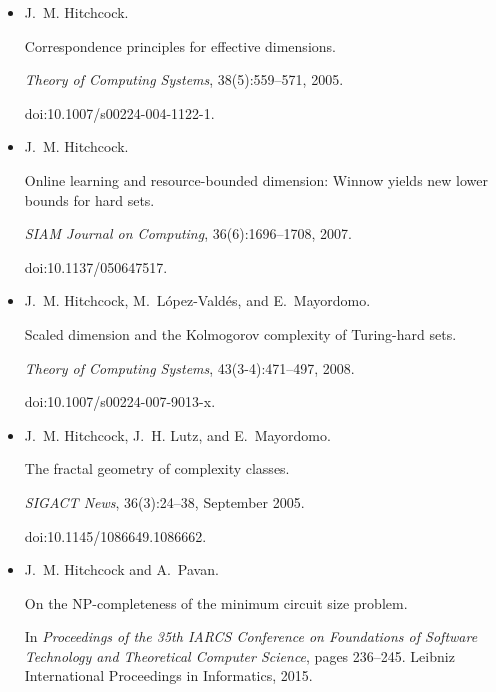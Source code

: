 \documentclass[10pt,a4paper]{article}
\begin{document}
\begin{itemize}
\item[] 
[30]

J. M. Hitchcock.


Correspondence principles for effective dimensions.


\emph{Theory of Computing Systems}, 38(5):559–571, 2005.


doi:10.1007/s00224-004-1122-1.





\item[] 
[31]

J. M. Hitchcock.


Online learning and resource-bounded dimension: Winnow yields new
lower bounds for hard sets.


\emph{SIAM Journal on Computing}, 36(6):1696–1708, 2007.


doi:10.1137/050647517.





\item[] 
[32]

J. M. Hitchcock, M. López-Valdés, and E. Mayordomo.


Scaled dimension and the Kolmogorov complexity of Turing-hard
sets.


\emph{Theory of Computing Systems}, 43(3-4):471–497, 2008.


doi:10.1007/s00224-007-9013-x.





\item[] 
[33]

J. M. Hitchcock, J. H. Lutz, and E. Mayordomo.


The fractal geometry of complexity classes.


\emph{SIGACT News}, 36(3):24–38, September 2005.


doi:10.1145/1086649.1086662.





\item[] 
[34]

J. M. Hitchcock and A. Pavan.


On the NP-completeness of the minimum circuit size problem.


In \emph{Proceedings of the 35th IARCS Conference on Foundations of
Software Technology and Theoretical Computer Science}, pages 236–245.
Leibniz International Proceedings in Informatics, 2015.



\end{itemize}
\end{document}
